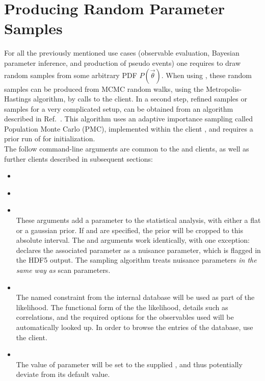 \section{Producing Random Parameter Samples}
\label{sec:usage:eos-sample-mcmc+pmc}

For all the previously mentioned use cases (observable evaluation, Bayesian
parameter inference, and production of pseudo events) one requires to draw
random samples from some arbitrary \gls{PDF} $P(\vec\theta)$.  When using \EOS,
these random samples can be produced from \gls{MCMC} random walks, using the
Metropolis-Hastings algorithm, by calls to the  client.
In a second step, refined samples or samples for a very complicated setup, can
be obtained from an algorithm described in Ref.~\cite{Beaujean:2013}. This
algorithm uses an adaptive importance sampling called Population Monte Carlo
(PMC), implemented within the client , and requires a
prior run of  for initialization.\\


The follow command-line arguments are common to the  and
 clients, as well as further clients described in subsequent
sections:
\begin{itemize}
    \item[] \\[-3\medskipamount]
    \item[] \\[-3\medskipamount]
    \item[] \\[\medskipamount]
        These arguments add a parameter to the statistical analysis, with
        either a flat or a gaussian prior. If  and
         are specified, the prior will be cropped to this
        absolute interval.  The  and 
        arguments work identically, with one exception: 
        declares the associated parameter as a nuisance parameter, which is
        flagged in the \gls{HDF5} output. The sampling algorithm treats nuisance
        parameters \emph{in the same way as} scan parameters.

    \item[] \\[\medskipamount]
        The named constraint from the internal database will be used as part of
        the likelihood. The functional form of the the likelihood, details such
        as correlations, and the required options for the observables used will
        be automatically looked up. In order to browse the entries of the
        database, use the  client.

    \item[] \\[\medskipamount]
        The value of parameter  will be set to the supplied
        , and thus potentially deviate from its default value.
\end{itemize}

